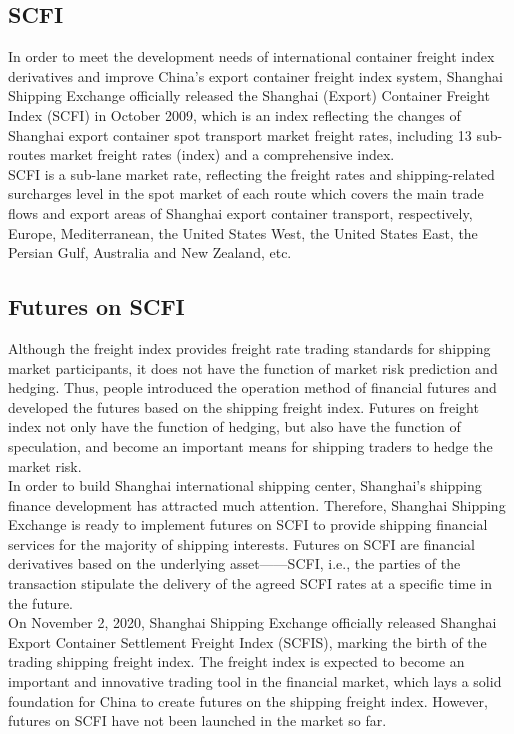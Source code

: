 \documentclass{aas}
\begin{document}
\begin{multicols}{2}
	\subsection{SCFI}

	In order to meet the development needs of international container freight index derivatives and improve China's export container freight index system, Shanghai Shipping Exchange officially released the Shanghai (Export) Container Freight Index (SCFI) in October 2009, which is an index reflecting the changes of Shanghai export container spot transport market freight rates, including 13 sub-routes market freight rates (index) and a comprehensive index. \\

	SCFI is a sub-lane market rate, reflecting the freight rates and shipping-related surcharges level in the spot market of each route which covers the main trade flows and export areas of Shanghai export container transport, respectively, Europe, Mediterranean, the United States West, the United States East, the Persian Gulf, Australia and New Zealand, etc. \\

	\subsection{Futures on SCFI}

	Although the freight index provides freight rate trading standards for shipping market participants, it does not have the function of market risk prediction and hedging. Thus, people introduced the operation method of financial futures and developed the futures based on the shipping freight index. Futures on freight index not only have the function of hedging, but also have the function of speculation, and become an important means for shipping traders to hedge the market risk. \\

	In order to build Shanghai international shipping center, Shanghai's shipping finance development has attracted much attention. Therefore, Shanghai Shipping Exchange is ready to implement futures on SCFI  to provide shipping financial services for the majority of shipping interests. Futures on SCFI are financial derivatives based on the underlying asset——SCFI, i.e., the parties of the transaction stipulate the delivery of the agreed SCFI rates at a specific time in the future. \\

	On November 2, 2020, Shanghai Shipping Exchange officially released Shanghai Export Container Settlement Freight Index (SCFIS), marking the birth of the trading shipping freight index. The freight index is expected to become an important and innovative trading tool in the financial market, which lays a solid foundation for China to create futures on the shipping freight index. However, futures on SCFI have not been launched in the market so far. \\


\end{multicols}
\end{document}
